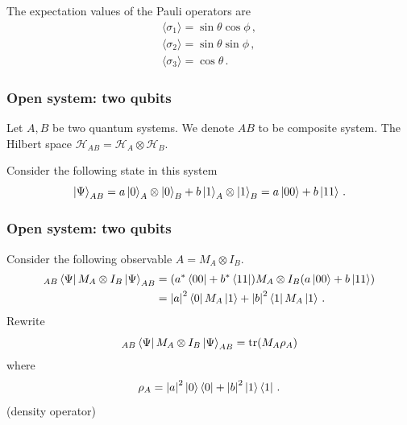 \documentclass[12pt, aspectratio=169]{beamer}
\begin{document}
\begin{frame}
    \begin{theorem}
        The expectation values of the Pauli operators are
        \begin{gather*}
            \langle \sigma_1 \rangle = \sin \theta \cos \phi \,,  \\
            \langle \sigma_2 \rangle = \sin \theta \sin \phi \,, \\
            \langle \sigma_3 \rangle = \cos \theta \,.
        \end{gather*}
    \end{theorem}

\end{frame}

\begin{frame}
    \frametitle{Open system: two qubits}
    Let $A, B$ be two quantum systems. We denote $AB$ to be composite system.
    The Hilbert space $\mathcal{H}_{AB} = \mathcal{H}_A \otimes \mathcal{H}_B$.

    Consider the following state in this system
    \begin{equation*}
        \ket{\Psi}_{AB} = a \ket{0}_A \otimes \ket{0}_B +
                            b \ket{1}_A \otimes \ket{1}_B
                            = a \ket{00} + b\ket{11} \,.
    \end{equation*}
\end{frame}

\begin{frame}
    \frametitle{Open system: two qubits}
    Consider the following observable $A = M_A \otimes I_B$.
    \begin{align*}
        _{AB} \bra{\Psi} M_A \otimes I_B \ket{\Psi}_{AB} 
        &=
        (a^* \bra{00} + b^*\bra{11}) M_A \otimes I_B (a\ket{00} + b\ket{11})\\
        &= \abs{a}^2 \bra{0}M_A \ket{1} + \abs{b}^2 \bra{1} M_A \ket{1} \,.
    \end{align*}
    Rewrite
    \begin{equation*}
        _{AB} \bra{\Psi} M_A \otimes I_B \ket{\Psi}_{AB} 
        =
        \tr(M_A \rho_A)
    \end{equation*}
    where 
    \begin{equation*}
        \rho_A = \abs{a}^2 \ket{0}\bra{0} + \abs{b}^2 \ket{1}\bra{1} \,.
    \end{equation*}
    (density operator)

\end{frame}
\end{document}
